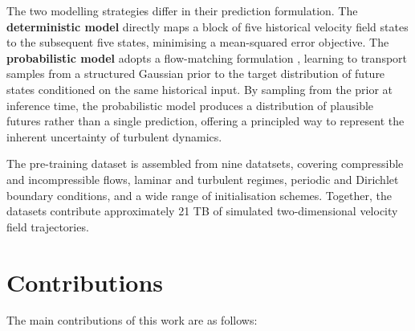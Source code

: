 The two modelling strategies differ in their prediction formulation. The \textbf{deterministic model} directly maps a block of five historical velocity field states to the subsequent five states, minimising a mean-squared error objective. The \textbf{probabilistic model} adopts a flow-matching formulation \citep{lipman2022flowmatching}, learning to transport samples from a structured Gaussian prior to the target distribution of future states conditioned on the same historical input. By sampling from the prior at inference time, the probabilistic model produces a distribution of plausible futures rather than a single prediction, offering a principled way to represent the inherent uncertainty of turbulent dynamics.

The pre-training dataset is assembled from nine datatsets, covering compressible and incompressible flows, laminar and turbulent regimes, periodic and Dirichlet boundary conditions, and a wide range of initialisation schemes. Together, the datasets contribute approximately 21 TB of simulated two-dimensional velocity field trajectories.

\section{Contributions}

The main contributions of this work are as follows:

